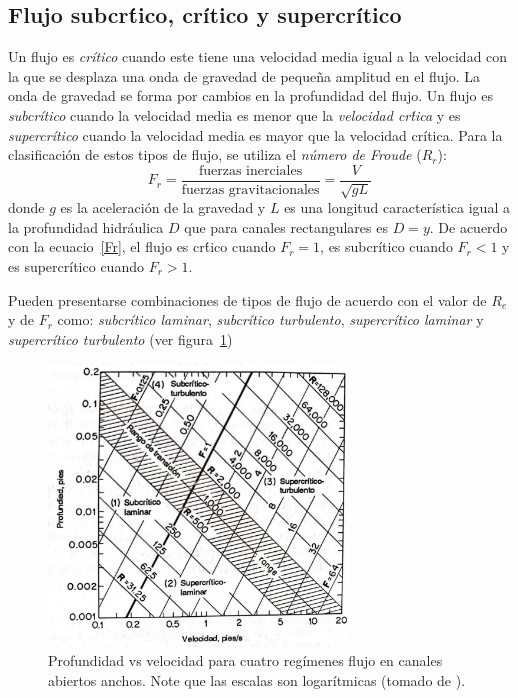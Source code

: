 \documentclass[11pt, oneside]{article}
\begin{document}
\subsection{Flujo subcr\'tico, cr\'itico y supercr\'itico}
Un flujo es \emph{cr\'itico} cuando este tiene una velocidad media igual a la velocidad con la que se desplaza una onda de gravedad de pequeña amplitud en el flujo. La onda de gravedad se forma por cambios en la profundidad del flujo. Un flujo es \emph{subcr\'itico} cuando la velocidad media es menor que la \emph{velocidad cr\'tica} y es \emph{supercr\'itico} cuando la velocidad media es mayor que la velocidad cr\'itica. Para la clasificaci\'on de estos tipos de flujo, se utiliza el \emph{n\'umero de Froude} ($R_r$):
\begin{equation}
F_r = \frac{\text{fuerzas inerciales}}{\text{fuerzas gravitacionales}} = \frac{V}{\sqrt{g L}}
\label{Fr}
\end{equation}
donde $g$ es la aceleraci\'on de la gravedad y $L$ es una longitud característica igual a la profundidad hidráulica $D$ que para canales rectangulares es $D=y$. De acuerdo con la ecuacio~\ref{Fr}, el flujo es cr\'tico cuando $F_r = 1$, es subcr\'itico cuando $F_r < 1$ y es supercr\'itico cuando $F_r > 1$.

Pueden presentarse combinaciones de tipos de flujo de acuerdo con el valor de $R_e$ y de $F_r$ como: \emph{subcr\'itico laminar}, \emph{subcr\'itico turbulento}, \emph{supercr\'itico laminar} y \emph{supercr\'itico turbulento} (ver figura~\ref{fig41})

\begin{figure}[h]
\centering
\includegraphics[width=8cm]{fig41.jpeg}
\caption{Profundidad vs velocidad para cuatro regímenes flujo en canales abiertos anchos. Note que las escalas son logarítmicas (tomado de \cite{VChow}).}
\label{fig41}
\end{figure}
\end{document}
